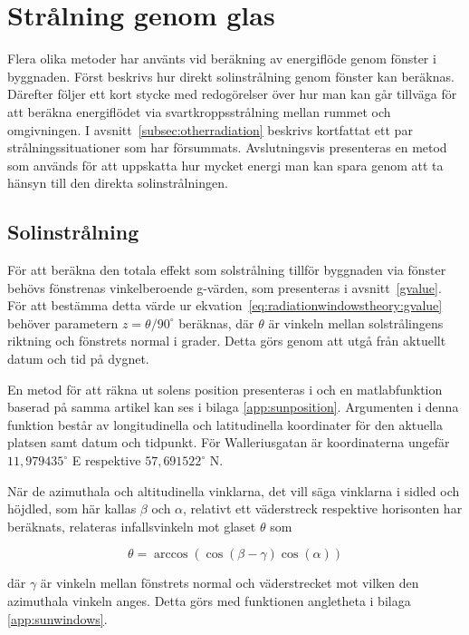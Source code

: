 \section{Strålning genom glas}\label{sec:sunthroughwindowsmethod}

Flera olika metoder har använts vid beräkning av energiflöde genom fönster i byggnaden. Först beskrivs hur direkt solinstrålning genom fönster kan beräknas. Därefter följer ett kort stycke med redogörelser över hur man kan går tillväga för att beräkna energiflödet via svartkroppsstrålning mellan rummet och omgivningen. I avsnitt~\ref{subsec:otherradiation} beskrivs kortfattat ett par strålningssituationer som har försummats. Avslutningsvis presenteras en metod som används för att uppskatta hur mycket energi man kan spara genom att ta hänsyn till den direkta solinstrålningen.

\subsection{Solinstrålning}
För att beräkna den totala effekt som solstrålning tillför byggnaden via fönster behövs fönstrenas vinkelberoende g-värden, som presenteras i avsnitt~\ref{gvalue}. För att bestämma detta värde ur ekvation~\eqref{eq:radiationwindowstheory:gvalue} behöver parametern $z = \theta/90^\circ$ beräknas, där $\theta$ är vinkeln mellan solstrålingens riktning och fönstrets normal i grader. Detta görs genom att utgå från aktuellt datum och tid på dygnet.

En metod för att räkna ut solens position presenteras i \cite{blanco01} och en matlabfunktion baserad på samma artikel kan ses i bilaga \ref{app:sunposition}. Argumenten i denna funktion består av longitudinella och latitudinella koordinater för den aktuella platsen samt datum och tidpunkt. För Walleriusgatan är koordinaterna ungefär $11,979435^\circ$ E respektive $57,691522^\circ$ N.

När de azimuthala och altitudinella vinklarna, det vill säga vinklarna i sidled och höjdled, som här kallas $\beta$ och $\alpha$, relativt ett väderstreck respektive horisonten har beräknats, relateras infallsvinkeln mot glaset $\theta$ som

\begin{equation} 
\theta = \arccos{\left( \cos{\left(\beta - \gamma\right)}\cos{\left(\alpha\right)}\right)}
\end{equation}

där $\gamma$ är vinkeln mellan fönstrets normal och väderstrecket mot vilken den azimuthala vinkeln anges. Detta görs med funktionen angletheta i bilaga \ref{app:sunwindows}.

